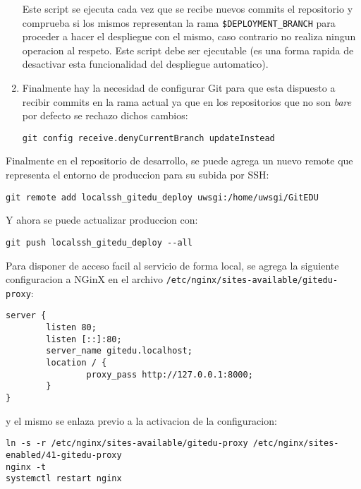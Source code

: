 \begin{enumerate}
\begin{lstlisting}[breaklines=true]
    \end{lstlisting}
    Este script se ejecuta cada vez que se recibe nuevos commits el repositorio y comprueba si los mismos representan la rama \texttt{\$DEPLOYMENT\_BRANCH} para proceder a hacer el despliegue con el mismo, caso contrario no realiza ningun operacion al respeto. Este script debe ser ejecutable (es una forma rapida de desactivar esta funcionalidad del despliegue automatico).
    \item Finalmente hay la necesidad de configurar Git para que esta dispuesto a recibir commits en la rama actual ya que en los repositorios que no son \textit{bare} por defecto se rechazo dichos cambios:
    \begin{lstlisting}
git config receive.denyCurrentBranch updateInstead
    \end{lstlisting}
\end{enumerate}

Finalmente en el repositorio de desarrollo, se puede agrega un nuevo remote que representa el entorno de produccion para su subida por SSH:
\begin{lstlisting}
git remote add localssh_gitedu_deploy uwsgi:/home/uwsgi/GitEDU
\end{lstlisting}

Y ahora se puede actualizar produccion con:
\begin{lstlisting}
git push localssh_gitedu_deploy --all
\end{lstlisting}

Para disponer de acceso facil al servicio de forma local, se agrega la siguiente configuracion a NGinX en el archivo \texttt{/etc/nginx/sites-available/gitedu-proxy}:
\begin{lstlisting}
server {
        listen 80;
        listen [::]:80;
        server_name gitedu.localhost;
        location / {
                proxy_pass http://127.0.0.1:8000;
        }
}
\end{lstlisting}
y el mismo se enlaza previo a la activacion de la configuracion:
\begin{lstlisting}[breaklines=true]
ln -s -r /etc/nginx/sites-available/gitedu-proxy /etc/nginx/sites-enabled/41-gitedu-proxy
nginx -t
systemctl restart nginx
\end{lstlisting}

